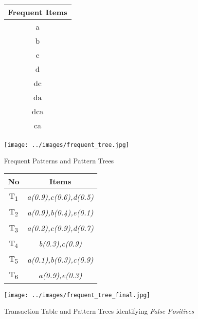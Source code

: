 %
\begin{figure}
\begin{minipage}{0.40\textwidth}
  \centering
  
	\begin{center}
	\begin{tabular}{ |c| } 
 	\hline
 		Frequent Items\\ \hline\hline
 		a \\ \hline
 		b \\ \hline
 		c \\ \hline
 		d \\ \hline
 		dc \\ \hline
 		da \\ \hline
 		dca \\ \hline
 		ca \\ \hline
\end{tabular}
\end{center}  
  
  
\end{minipage}
\hfill
\begin{minipage}{0.40\textwidth}
  \centering
  \texttt{[image: ../images/frequent\_tree.jpg]}
\end{minipage}
\caption{Frequent Patterns and Pattern Trees}
\label{figure:frequent_patterns}
\end{figure}
\begin{figure}
\begin{minipage}{.4\textwidth}
  \centering
  
	\begin{center}
	\begin{tabular}{ |c|c| } 
 	\hline
 		No & Items \\ \hline\hline
 		T\textsubscript{1} & \emph{a(0.9),c(0.6),d(0.5)}\\ \hline
 		T\textsubscript{2}& \emph{a(0.9),b(0.4),e(0.1)}\\ \hline
 		T\textsubscript{3}& \emph{a(0.2),c(0.9),d(0.7)}\\ \hline
 		T\textsubscript{4}& \emph{b(0.3),c(0.9)}\\ \hline
 		T\textsubscript{5}& \emph{a(0.1),b(0.3),c(0.9)} \\ \hline
 		T\textsubscript{6} & \emph{a(0.9),e(0.3)
}\\ \hline
\end{tabular}
\end{center}  
\end{minipage}
\hfill
\begin{minipage}{0.50\textwidth}
  \centering
  \texttt{[image: ../images/frequent\_tree\_final.jpg]}
\end{minipage}
\caption{Transaction Table and Pattern Trees identifying \emph{False Positives}}
\label{figure:frequent_patterns_final}
\end{figure}
%
